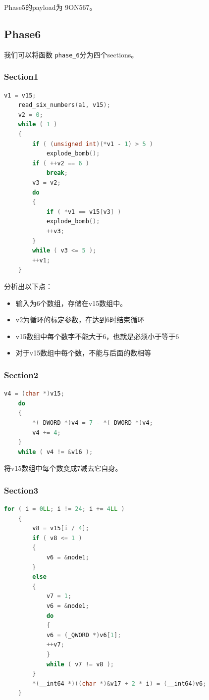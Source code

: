 \documentclass[a4pper,12pt,onecolumn]{article}
\begin{document}
Phase5的payload为 9ON567。

\subsection{Phase6}

我们可以将函数 \texttt{phase\_6}分为四个sections。

\subsubsection{Section1}

\begin{lstlisting}[language=c]
    v1 = v15;
    read_six_numbers(a1, v15);
    v2 = 0;
    while ( 1 )
    {
        if ( (unsigned int)(*v1 - 1) > 5 )
            explode_bomb();
        if ( ++v2 == 6 )
            break;
        v3 = v2;
        do
        {
            if ( *v1 == v15[v3] )
            explode_bomb();
            ++v3;
        }
        while ( v3 <= 5 );
        ++v1;
    }
\end{lstlisting}

分析出以下点：

\begin{itemize}
    \item 输入为6个数组，存储在v15数组中。
    \item v2为循环的标定参数，在达到6时结束循环
    \item v15数组中每个数字不能大于6，也就是必须小于等于6
    \item 对于v15数组中每个数，不能与后面的数相等
\end{itemize}

\subsubsection{Section2}

\begin{lstlisting}[language=c]
    v4 = (char *)v15;
    do
    {
        *(_DWORD *)v4 = 7 - *(_DWORD *)v4;
        v4 += 4;
    }
    while ( v4 != &v16 );
\end{lstlisting}

将v15数组中每个数变成7减去它自身。

\subsubsection{Section3}

\begin{lstlisting}[language=c]
    for ( i = 0LL; i != 24; i += 4LL )
    {
        v8 = v15[i / 4];
        if ( v8 <= 1 )
        {
            v6 = &node1;
        }
        else
        {
            v7 = 1;
            v6 = &node1;
            do
            {
            v6 = (_QWORD *)v6[1];
            ++v7;
            }
            while ( v7 != v8 );
        }
        *(__int64 *)((char *)&v17 + 2 * i) = (__int64)v6;
    }
\end{lstlisting}
\end{document}
